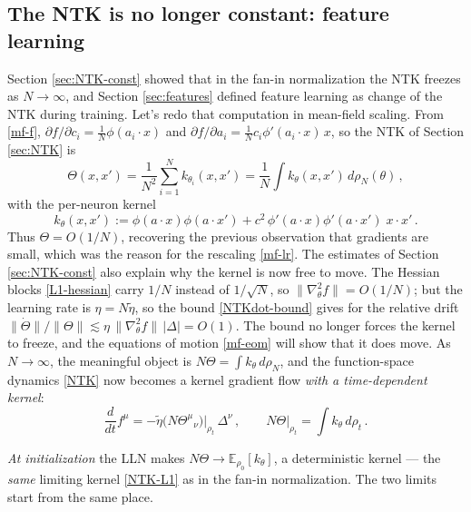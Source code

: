 \documentclass[11pt]{article}
\newcommand{\E}{\mathbb{E}}
\newcommand{\pd}{\partial}
\begin{document}
\subsection{The NTK is no longer constant: feature learning}
\label{sec:MFT-NTK}

Section \ref{sec:NTK-const} showed that in the fan-in normalization the NTK freezes as $N\to\infty$, and Section \ref{sec:features} defined feature learning as change of the NTK during training. Let's redo that computation in mean-field scaling. From \eqref{mf-f}, $\pd f/\pd c_i = \frac{1}{N}\phi(a_i\cdot x)$ and $\pd f/\pd a_i = \frac{1}{N} c_i\phi'(a_i\cdot x)\,x$, so the NTK of Section \ref{sec:NTK} is
%
\begin{equation} \label{mf-ntk}
    \Theta(x,x') = \frac{1}{N^2}\sum_{i=1}^N k_{\theta_i}(x,x') = \frac{1}{N} \int k_\theta(x,x')\, d\rho_N(\theta)\,,
\end{equation}
%
with the per-neuron kernel
%
\begin{equation}
    k_\theta(x,x') := \phi(a\cdot x)\phi(a\cdot x') + c^2\,\phi'(a\cdot x)\phi'(a\cdot x')\; x\cdot x'\,.
\end{equation}
%
Thus $\Theta = O(1/N)$, recovering the previous observation that gradients are small, which was the reason for the rescaling \eqref{mf-lr}. The estimates of Section \ref{sec:NTK-const} also explain why the kernel is now free to move. The Hessian blocks \eqref{L1-hessian} carry $1/N$ instead of $1/\sqrt N$, so $\|\nabla_\theta^2 f\| = O(1/N)$; but the learning rate is $\eta = N\tilde\eta$, so the bound \eqref{NTKdot-bound} gives for the relative drift $\|\dot\Theta\|/\|\Theta\| \lesssim \eta\,\|\nabla^2_\theta f\|\,|\Delta| = O(1)$. The bound no longer forces the kernel to freeze, and the equations of motion \eqref{mf-eom} will show that it does move. As $N\to \infty$, the meaningful object is $N\Theta = \int k_\theta\, d\rho_N$, and the function-space dynamics \eqref{NTK} now becomes a kernel gradient flow \emph{with a time-dependent kernel}:
%
\begin{equation} \label{mf-kernelflow}
    \frac{d}{dt} f^\mu = -\tilde\eta \big(N\Theta^\mu{}_\nu\big)\big|_{\rho_t}\, \Delta^\nu\,,
    \qquad
    N\Theta\big|_{\rho_t} = \int k_\theta\, d\rho_t\,.
\end{equation}
%

\emph{At initialization} the LLN makes $N\Theta \to \E_{\rho_0}[k_\theta]$, a deterministic kernel --- the \emph{same} limiting kernel \eqref{NTK-L1} as in the fan-in normalization. The two limits start from the same place.
\end{document}
